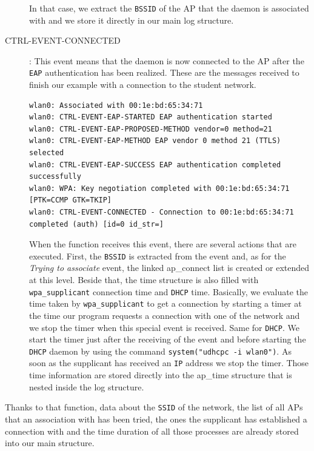\begin{description}
	In that case, we extract the \texttt{BSSID} of the AP that the daemon is associated with and we store it directly in our main log structure.

	\item[CTRL-EVENT-CONNECTED]:
	This event means that the daemon is now connected to the AP after the \texttt{EAP} authentication has been realized. These are the messages received to finish our example with a connection to the student network.\\

\begin{lstlisting}[frame=single,breaklines=true,caption={Example of a connection to the \texttt{student.UCLouvain} network - 3}]
wlan0: Associated with 00:1e:bd:65:34:71
wlan0: CTRL-EVENT-EAP-STARTED EAP authentication started
wlan0: CTRL-EVENT-EAP-PROPOSED-METHOD vendor=0 method=21
wlan0: CTRL-EVENT-EAP-METHOD EAP vendor 0 method 21 (TTLS) selected
wlan0: CTRL-EVENT-EAP-SUCCESS EAP authentication completed successfully
wlan0: WPA: Key negotiation completed with 00:1e:bd:65:34:71 [PTK=CCMP GTK=TKIP]
wlan0: CTRL-EVENT-CONNECTED - Connection to 00:1e:bd:65:34:71 completed (auth) [id=0 id_str=]
\end{lstlisting}

	When the function receives this event, there are several actions that are executed. First, the \texttt{BSSID} is extracted from the event and, as for the \textit{Trying to associate} event, the linked ap\_connect list is created or extended at this level. Beside that, the time structure is also filled with \texttt{wpa\_supplicant} connection time and \texttt{DHCP} time. Basically, we evaluate the time taken by \texttt{wpa\_supplicant} to get a connection by starting a timer at the time our program requests a connection with one of the network and we stop the timer when this special event is received. Same for \texttt{DHCP}. We start the timer just after the receiving of the event and before starting the \texttt{DHCP} daemon by using the command \texttt{system("udhcpc -i wlan0")}. As soon as the supplicant has received an \texttt{IP} address we stop the timer. Those time information are stored directly into the ap\_time structure that is nested inside the log structure.
\end{description}

Thanks to that function, data about the \texttt{SSID} of the network, the list of all APs that an association with has been tried, the ones the supplicant has established a connection with and the time duration of all those processes are already stored into our main structure.


